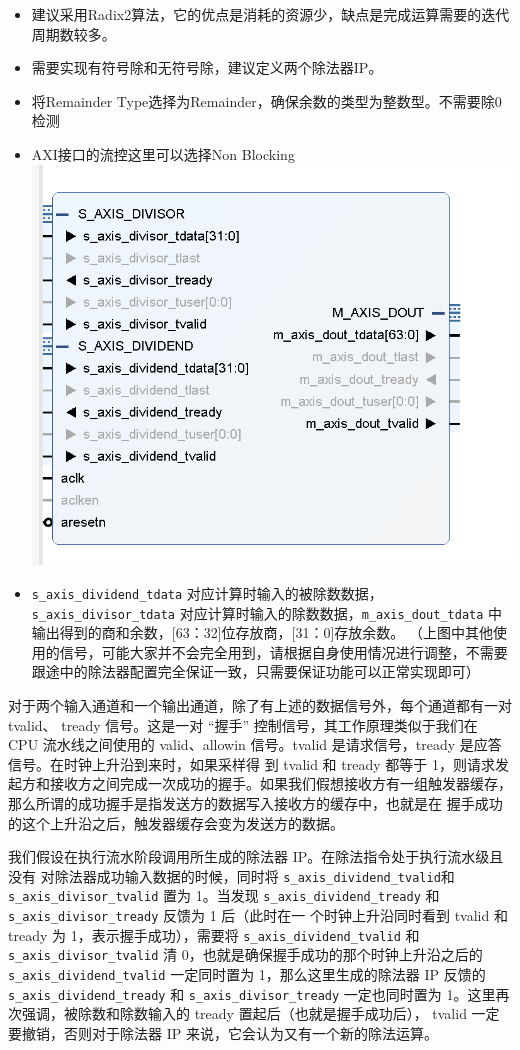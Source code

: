 \begin{itemize}
    \item 建议采用Radix2算法，它的优点是消耗的资源少，缺点是完成运算需要的迭代周期数较多。
    \item 需要实现有符号除和无符号除，建议定义两个除法器IP。
    \item 将Remainder Type选择为Remainder，确保余数的类型为整数型。不需要除0检测
    \item AXI接口的流控这里可以选择Non Blocking
    \subitem 
    \includegraphics[width=0.6\linewidth]{Figures/fig1.png}
    \item \texttt{s\_axis\_dividend\_tdata} 对应计算时输入的被除数数据，\texttt{s\_axis\_divisor\_tdata} 对应计算时输入的除数数据，\texttt{m\_axis\_dout\_tdata} 中输出得到的商和余数，[63：32]位存放商，[31：0]存放余数。
    （上图中其他使用的信号，可能大家并不会完全用到，请根据自身使用情况进行调整，不需要跟途中的除法器配置完全保证一致，只需要保证功能可以正常实现即可）
\end{itemize}

对于两个输入通道和一个输出通道，除了有上述的数据信号外，每个通道都有一对 tvalid、
tready 信号。这是一对 “握手” 控制信号，其工作原理类似于我们在 CPU 流水线之间使用的
valid、allowin 信号。tvalid 是请求信号，tready 是应答信号。在时钟上升沿到来时，如果采样得
到 tvalid 和 tready 都等于 1，则请求发起方和接收方之间完成一次成功的握手。如果我们假想接收方有一组触发器缓存，那么所谓的成功握手是指发送方的数据写入接收方的缓存中，也就是在
握手成功的这个上升沿之后，触发器缓存会变为发送方的数据。

我们假设在执行流水阶段调用所生成的除法器 IP。在除法指令处于执行流水级且没有
对除法器成功输入数据的时候，同时将
\texttt{s\_axis\_dividend\_tvalid}和\texttt{s\_axis\_divisor\_tvalid}
置为 1。当发现 \texttt{s\_axis\_dividend\_tready} 和 \texttt{s\_axis\_divisor\_tready} 反馈为 1 后（此时在一
个时钟上升沿同时看到 tvalid 和 tready 为 1，表示握手成功），需要将 \texttt{s\_axis\_dividend\_tvalid} 和
\texttt{s\_axis\_divisor\_tvalid} 清 0，也就是确保握手成功的那个时钟上升沿之后的 \texttt{s\_axis\_dividend\_tvalid}
一定同时置为 1，那么这里生成的除法器 IP 反馈的 \texttt{s\_axis\_dividend\_tready} 和 \texttt{s\_axis\_divisor\_tready}
一定也同时置为 1。这里再次强调，被除数和除数输入的 tready 置起后（也就是握手成功后），
tvalid 一定要撤销，否则对于除法器 IP 来说，它会认为又有一个新的除法运算。

